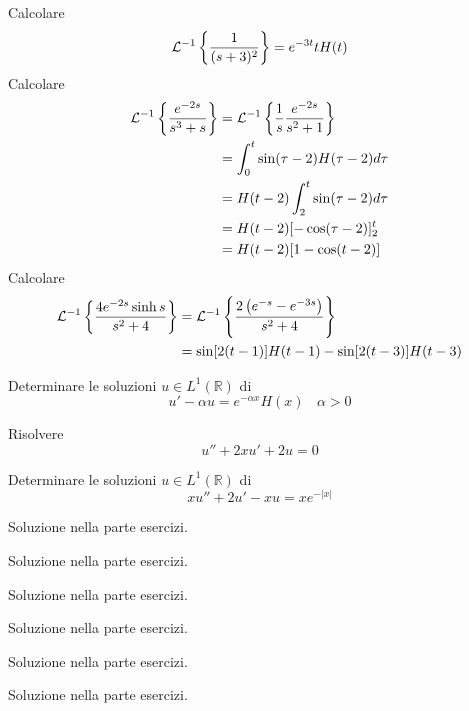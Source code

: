 Calcolare
\begin{equation*}
\mathcal{L}^{-1}\left\{\frac{1}{( s+3)^{2}}\right\} =e^{-3t} tH( t)
\end{equation*}
Calcolare
\begin{equation*}
\begin{aligned}
\mathcal{L}^{-1}\left\{\frac{e^{-2s}}{s^{3} +s}\right\} & =\mathcal{L}^{-1}\left\{\frac{1}{s}\frac{e^{-2s}}{s^{2} +1}\right\}\\
 & =\int ^{t}_{0}\sin( \tau -2) H( \tau -2) d\tau \\
 & =H( t-2)\int ^{t}_{2}\sin( \tau -2) d\tau \\
 & =H( t-2)[ -\cos( \tau -2)]^{t}_{2}\\
 & =H( t-2)[ 1-\cos( t-2)]
\end{aligned}
\end{equation*}
Calcolare
\begin{equation*}
\begin{aligned}
\mathcal{L}^{-1}\left\{\frac{4e^{-2s}\sinh s}{s^{2} +4}\right\} & =\mathcal{L}^{-1}\left\{\frac{2\left( e^{-s} -e^{-3s}\right)}{s^{2} +4}\right\}\\
 & =\sin[ 2( t-1)] H( t-1) -\sin[ 2( t-3)] H( t-3)
\end{aligned}
\end{equation*}
\Esercizio{}

Determinare le soluzioni $u\in L^{1}(\mathbb{R})$ di
\begin{equation*}
u'-\alpha u=e^{-\alpha x} H( x) \ \ \ \ \alpha  >0
\end{equation*}
\Esercizio{}

Risolvere
\begin{equation*}
u''+2xu'+2u=0
\end{equation*}
\Esercizio{}

Determinare le soluzioni $u\in L^{1}(\mathbb{R})$ di
\begin{equation*}
xu''+2u'-xu=xe^{-| x| }
\end{equation*}
\ParteSoluzioni
\Soluzione

Soluzione nella parte esercizi.
\Soluzione

Soluzione nella parte esercizi.
\Soluzione

Soluzione nella parte esercizi.
\Soluzione

Soluzione nella parte esercizi.
\Soluzione

Soluzione nella parte esercizi.
\Soluzione

Soluzione nella parte esercizi.
\Soluzione

